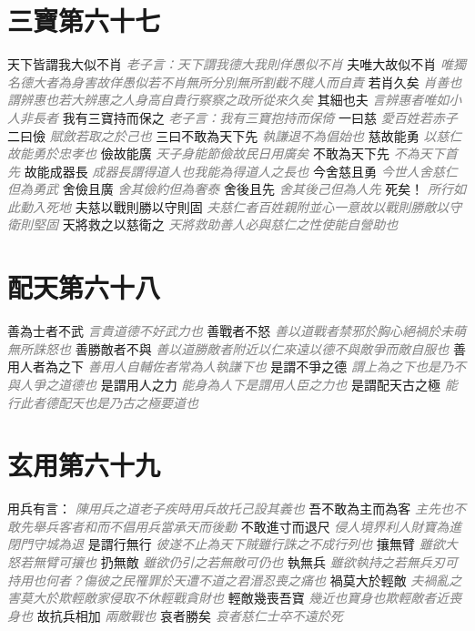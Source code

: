 \documentclass[a4paper,zihao=-4,oneside,landscape,UTF8]{ctexart}
\newcommand{\zhushi}[1]{\scriptsize{\textit{\textcolor{gray}{#1}}}\normalsize}
\begin{document}
\section{三寶第六十七}

天下皆謂我大似不肖
\zhushi{老子言：天下謂我德大我則佯愚似不肖}
夫唯大故似不肖
\zhushi{唯獨名德大者為身害故佯愚似若不肖無所分別無所割截不賤人而自責}
若肖久矣
\zhushi{肖善也謂辨惠也若大辨惠之人身高自貴行察察之政所從來久矣}
其細也夫
\zhushi{言辨惠者唯如小人非長者}
我有三寶持而保之
\zhushi{老子言：我有三寶抱持而保倚}
一曰慈
\zhushi{愛百姓若赤子}
二曰儉
\zhushi{賦斂若取之於己也}
三曰不敢為天下先
\zhushi{執謙退不為倡始也}
慈故能勇
\zhushi{以慈仁故能勇於忠孝也}
儉故能廣
\zhushi{天子身能節儉故民日用廣矣}
不敢為天下先
\zhushi{不為天下首先}
故能成器長
\zhushi{成器長謂得道人也我能為得道人之長也}
今舍慈且勇
\zhushi{今世人舍慈仁但為勇武}
舍儉且廣
\zhushi{舍其儉約但為奢泰}
舍後且先
\zhushi{舍其後己但為人先}
死矣！
\zhushi{所行如此動入死地}
夫慈以戰則勝以守則固
\zhushi{夫慈仁者百姓親附並心一意故以戰則勝敵以守衛則堅固}
天將救之以慈衛之
\zhushi{天將救助善人必與慈仁之性使能自營助也}


\section{配天第六十八}

善為士者不武
\zhushi{言貴道德不好武力也}
善戰者不怒
\zhushi{善以道戰者禁邪於胸心絕禍於未萌無所誅怒也}
善勝敵者不與
\zhushi{善以道勝敵者附近以仁來遠以德不與敵爭而敵自服也}
善用人者為之下
\zhushi{善用人自輔佐者常為人執謙下也}
是謂不爭之德
\zhushi{謂上為之下也是乃不與人爭之道德也}
是謂用人之力
\zhushi{能身為人下是謂用人臣之力也}
是謂配天古之極
\zhushi{能行此者德配天也是乃古之極要道也}


\section{玄用第六十九}

用兵有言：
\zhushi{陳用兵之道老子疾時用兵故托己設其義也}
吾不敢為主而為客
\zhushi{主先也不敢先舉兵客者和而不倡用兵當承天而後動}
不敢進寸而退尺
\zhushi{侵人境界利人財寶為進閉門守城為退}
是謂行無行
\zhushi{彼遂不止為天下賊雖行誅之不成行列也}
攘無臂
\zhushi{雖欲大怒若無臂可攘也}
扔無敵
\zhushi{雖欲仍引之若無敵可仍也}
執無兵
\zhushi{雖欲執持之若無兵刃可持用也何者？傷彼之民罹罪於天遭不道之君湣忍喪之痛也}
禍莫大於輕敵
\zhushi{夫禍亂之害莫大於欺輕敵家侵取不休輕戰貪財也}
輕敵幾喪吾寶
\zhushi{幾近也寶身也欺輕敵者近喪身也}
故抗兵相加
\zhushi{兩敵戰也}
哀者勝矣
\zhushi{哀者慈仁士卒不遠於死}
\end{document}
